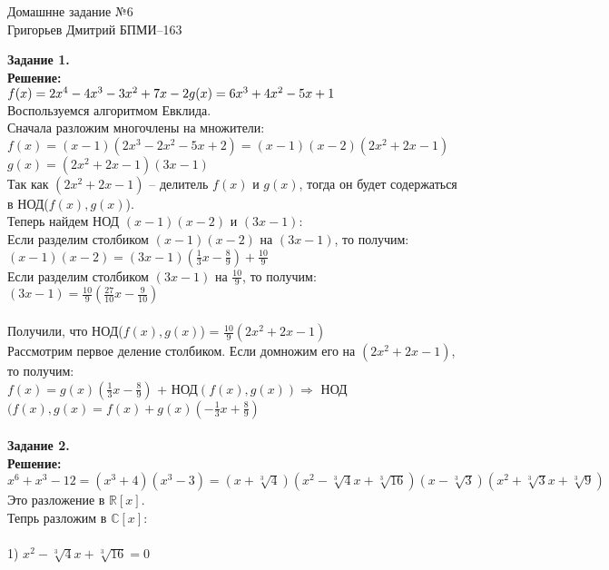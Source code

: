 \documentclass[12pt,a4paper]{scrartcl}
\begin{document}
	\begin{center}	
		Домашнне задание №6 \\
		Григорьев Дмитрий БПМИ--163
	\end{center}
	\textbf{Задание 1.}
	\\
	\textbf{Решение:}
	\\
	$f(x) = 2x^4 - 4x^3 - 3x^2 + 7x - 2\\
	g(x) = 6x^3 + 4x^2 - 5x + 1$\\
	Воспользуемся алгоритмом Евклида.\\
	Сначала разложим многочлены на множители:\\
	$f(x) = (x - 1)(2x^3 - 2x^2 - 5x + 2) = (x - 1)(x - 2)(2x^2 + 2x - 1)$\\
	$g(x) = (2x^2 + 2x - 1)(3x - 1)$\\
	Так как $(2x^2 + 2x - 1)$ -- делитель $f(x)$ и $g(x)$, тогда он будет содержаться в НОД($f(x), g(x)$).\\
	Теперь найдем НОД $(x - 1)(x - 2)$ и $(3x - 1)$:\\
	Если разделим столбиком $(x - 1)(x - 2)$ на $(3x - 1)$, то получим:\\
	$(x - 1)(x - 2) = (3x - 1)(\frac{1}{3}x - \frac{8}{9}) + \frac{10}{9}$\\
	Если разделим столбиком $(3x - 1)$ на $\frac{10}{9}$, то получим:\\
	$(3x - 1) = \frac{10}{9}(\frac{27}{10}x - \frac{9}{10})$\\
	\\
	Получили, что НОД($f(x), g(x)$) = $\frac{10}{9}(2x^2 + 2x - 1)$\\
	Рассмотрим первое деление столбиком. Если домножим его на $(2x^2 + 2x - 1)$, то получим:\\
	$f(x) = g(x)(\frac{1}{3}x - \frac{8}{9})$ + НОД$(f(x), g(x)) \Rightarrow$ НОД$(f(x), g(x) = f(x) + g(x)(-\frac{1}{3}x + \frac{8}{9})$\\
	\\
	\textbf{Задание 2.}\\
	\textbf{Решение:} 
	\\
	$x^6 + x^3 - 12 = (x^3 + 4)(x^3 - 3) = (x + \sqrt[3]{4})(x^2 - \sqrt[3]{4}x + \sqrt[3]{16})(x - \sqrt[3]{3})(x^2 + \sqrt[3]{3}x + \sqrt[3]{9})$\\
	Это разложение в $\mathbb{R}[x]$.\\
	Тепрь разложим в $\mathbb{C}[x]$:\\
	\\
	1) $x^2 - \sqrt[3]{4}x + \sqrt[3]{16} = 0$\\
\end{document}
